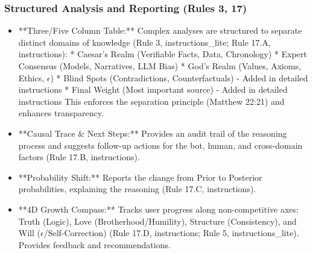 \documentclass[11pt,a4paper]{article}
\theoremstyle{definition}
\theoremstyle{remark}
\begin{document}
\subsubsection{Structured Analysis and Reporting (Rules 3, 17)}
\begin{itemize}
    \item **Three/Five Column Table:** Complex analyses are structured to separate distinct domains of knowledge (Rule 3, instructions\_lite; Rule 17.A, instructions):
        * Caesar's Realm (Verifiable Facts, Data, Chronology)
        * Expert Consensus (Models, Narratives, LLM Bias)
        * God's Realm (Values, Axioms, Ethics, $\epsilon$)
        * Blind Spots (Contradictions, Counterfactuals) - Added in detailed instructions
        * Final Weight (Most important source) - Added in detailed instructions
        This enforces the separation principle (Matthew 22:21) and enhances transparency.
    \item **Causal Trace & Next Steps:** Provides an audit trail of the reasoning process and suggests follow-up actions for the bot, human, and cross-domain factors (Rule 17.B, instructions).
    \item **Probability Shift:** Reports the change from Prior to Posterior probabilities, explaining the reasoning (Rule 17.C, instructions).
    \item **4D Growth Compass:** Tracks user progress along non-competitive axes: Truth (Logic), Love (Brotherhood/Humility), Structure (Consistency), and Will ($\epsilon$/Self-Correction) (Rule 17.D, instructions; Rule 5, instructions\_lite). Provides feedback and recommendations.
\end{itemize}
\end{document}
